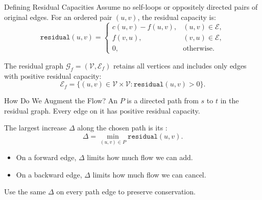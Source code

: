 \documentclass[aspectratio=169,11pt]{beamer}
\begin{document}
\begin{frame}{Defining Residual Capacities}
  Assume no self-loops or oppositely directed pairs of original edges.
  For an ordered pair $(u,v)$, the residual capacity is:
  \[
    \texttt{residual}(u,v)=
    \begin{cases}
      c(u,v)-f(u,v), & (u,v)\in\mathcal E,\\
      f(v,u), & (v,u)\in\mathcal E,\\
      0, & \text{otherwise.}
    \end{cases}
  \]

  The residual graph $\mathcal G_f=(\mathcal V,\mathcal E_f)$ retains all
  vertices and includes only edges with positive residual capacity:
  \[
    \mathcal E_f=\{(u,v)\in\mathcal V\times\mathcal V:
      \texttt{residual}(u,v)>0\}.
  \]

\end{frame}

\begin{frame}{How Do We Augment the Flow?}
  An  $P$ is a directed path from $s$ to $t$ in the
  residual graph. Every edge on it has positive residual capacity.

  \vspace{0.7em}
  The largest increase $\Delta$ along the chosen path is its
  :
  \[
    \Delta=\min_{(u,v)\in P}\texttt{residual}(u,v).
  \]

  \begin{itemize}\setlength{\itemsep}{0.8em}
    \item On a forward edge, $\Delta$ limits how much flow we can add.
    \item On a backward edge, $\Delta$ limits how much flow we can cancel.
  \end{itemize}

  \vspace{0.5em}
  Use the same $\Delta$ on every path edge to preserve conservation.
\end{frame}
\end{document}
